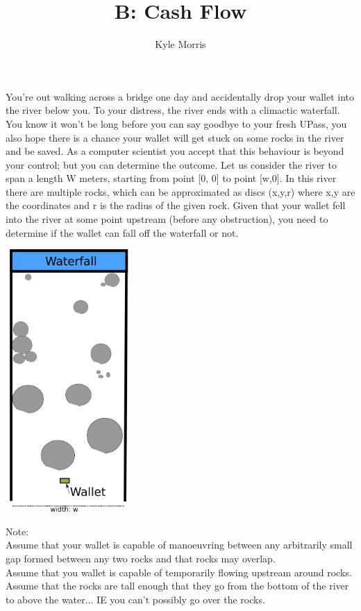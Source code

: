 \documentclass{article}
\title{B: Cash Flow}
\author{Kyle Morris}
\begin{document}
\begin{problemDescription}
You're out walking across a bridge one day and accidentally drop your wallet into the river below you. To your distress, the river ends with a climactic waterfall. You know it won't be long before you can say goodbye to your fresh UPass, you also hope there is a chance your wallet will get stuck on some rocks in the river and be saved. As a computer scientist you accept that this behaviour is beyond your control; but you can determine the outcome.
Let us consider the river to span a length W meters, starting from point [0, 0] to point [w,0].
In this river there are multiple rocks, which can be approximated as discs (x,y,r) where x,y are the coordinates and r is the radius of the given rock.
Given that your wallet fell into the river at some point upstream (before any obstruction), you need to determine if the wallet can fall off the waterfall or not.

\begin{center}
\includegraphics[height=10cm]{images/graphic_river}
\label{fig:sp500_long_results_zoomed}
\end{center}

Note:
\\
Assume that your wallet is capable of manoeuvring between any arbitrarily small gap formed between any two rocks and that rocks may overlap.
\\
Assume that you wallet is capable of temporarily flowing upstream around rocks. 
\\
Assume that the rocks are tall enough that they go from the bottom of the river to above the water... IE you can't possibly go over the rocks. 
\end{problemDescription}
\end{document}
